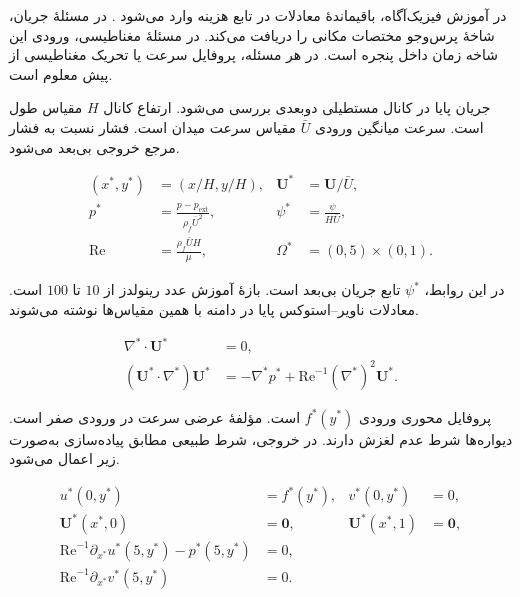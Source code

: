 در آموزش فیزیک‌آگاه، باقیماندهٔ معادلات در تابع هزینه وارد می‌شود \cite{wang2021pideeponet}.
در مسئلهٔ جریان، شاخهٔ پرس‌وجو مختصات مکانی را دریافت می‌کند.
در مسئلهٔ مغناطیسی، ورودی این شاخه زمان داخل پنجره است.
در هر مسئله، پروفایل سرعت یا تحریک مغناطیسی از پیش معلوم است.

\label{sec:forward-flow-operator}

جریان پایا در کانال مستطیلی دوبعدی بررسی می‌شود.
ارتفاع کانال $H$ مقیاس طول است.
سرعت میانگین ورودی $\bar U$ مقیاس سرعت میدان است.
فشار نسبت به فشار مرجع خروجی بی‌بعد می‌شود.

\begin{equation}
\begin{aligned}
(x^*,y^*) &= (x/H,y/H),&
\mathbf U^* &= \mathbf U/\bar U,\\
p^* &= \frac{p-p_{\mathrm{ext}}}{\rho_f\bar U^2},&
\psi^* &= \frac{\psi}{H\bar U},\\
\mathrm{Re} &= \frac{\rho_f\bar U H}{\mu},&
\Omega^* &= (0,5)\times(0,1).
\end{aligned}
\label{eq:forward-flow-scales}
\end{equation}

در این روابط، $\psi^*$ تابع جریان بی‌بعد است.
بازهٔ آموزش عدد رینولدز از $10$ تا $100$ است.
معادلات ناویر–استوکس پایا در دامنه با همین مقیاس‌ها نوشته می‌شوند.

\begin{equation}
\begin{aligned}
\nabla^*\!\cdot\mathbf U^* &=0,\\
(\mathbf U^*\!\cdot\nabla^*)\mathbf U^*
&=-\nabla^*p^*+\mathrm{Re}^{-1}(\nabla^*)^2\mathbf U^* .
\end{aligned}
\label{eq:forward-flow-equations}
\end{equation}

پروفایل محوری ورودی $f^*(y^*)$ است.
مؤلفهٔ عرضی سرعت در ورودی صفر است.
دیواره‌ها شرط عدم لغزش دارند.
در خروجی، شرط طبیعی مطابق پیاده‌سازی به‌صورت زیر اعمال می‌شود.

\begin{equation}
\begin{aligned}
u^*(0,y^*)&=f^*(y^*), & v^*(0,y^*)&=0,\\
\mathbf U^*(x^*,0)&=\mathbf 0, &
\mathbf U^*(x^*,1)&=\mathbf 0,\\
\mathrm{Re}^{-1}\partial_{x^*}u^*(5,y^*)-p^*(5,y^*)&=0,\\
\mathrm{Re}^{-1}\partial_{x^*}v^*(5,y^*)&=0.
\end{aligned}
\label{eq:forward-flow-boundaries}
\end{equation}

